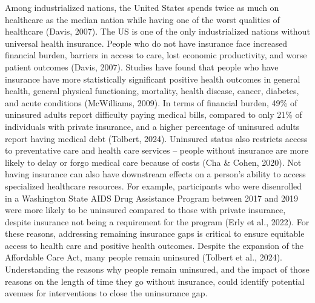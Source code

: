 \documentclass[12pt]{article}
\begin{document}
Among industrialized nations, the United States spends twice as much on healthcare as the median nation while having one of the worst qualities of healthcare (Davis, 2007). The US is one of the only industrialized nations without universal health insurance. People who do not have insurance face increased financial burden, barriers in access to care, lost economic productivity, and worse patient outcomes (Davis, 2007). Studies have found that people who have insurance have more statistically significant positive health outcomes in general health, general physical functioning, mortality, health disease, cancer, diabetes, and acute conditions (McWilliams, 2009). In terms of financial burden, 49\% of uninsured adults report difficulty paying medical bills, compared to only 21\% of individuals with private insurance, and a higher percentage of uninsured adults report having medical debt (Tolbert, 2024). Uninsured status also restricts access to preventative care and health care services – people without insurance are more likely to delay or forgo medical care because of costs (Cha \& Cohen, 2020). Not having insurance can also have downstream effects on a person’s ability to access specialized healthcare resources. For example, participants who were disenrolled in a Washington State AIDS Drug Assistance Program between 2017 and 2019 were more likely to be uninsured compared to those with private insurance, despite insurance not being a requirement for the program (Erly et al., 2022). For these reasons, addressing remaining insurance gaps is critical to ensure equitable access to health care and positive health outcomes. Despite the expansion of the Affordable Care Act, many people remain uninsured (Tolbert et al., 2024). Understanding the reasons why people remain uninsured, and the impact of those reasons on the length of time they go without insurance, could identify potential avenues for interventions to close the uninsurance gap.
\end{document}

